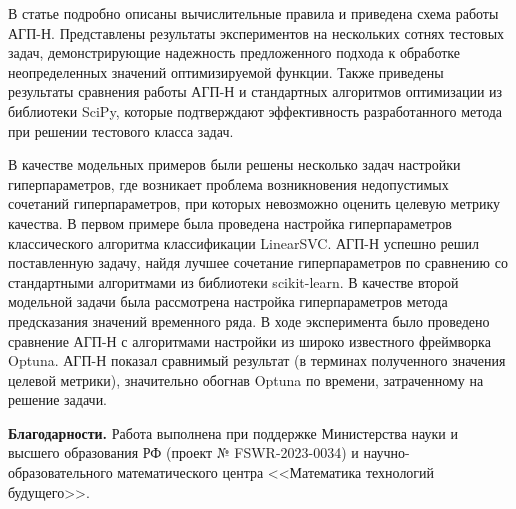 \documentclass[a4paper,12pt,russian]{article}
\begin{document}
В статье подробно описаны вычислительные правила и приведена схема работы АГП-Н. Представлены результаты экспериментов на нескольких сотнях тестовых задач, демонстрирующие надежность предложенного подхода к обработке неопределенных значений оптимизируемой функции. Также приведены результаты сравнения работы АГП-Н и стандартных алгоритмов оптимизации из библиотеки SciPy, которые подтверждают эффективность разработанного метода при решении тестового класса задач.

В качестве модельных примеров были решены несколько задач настройки гиперпараметров, где возникает проблема возникновения недопустимых сочетаний гиперпараметров, при которых невозможно оценить целевую метрику качества.
В первом примере была проведена настройка гиперпараметров классического алгоритма классификации LinearSVC. АГП-Н успешно решил поставленную задачу, найдя лучшее сочетание гиперпараметров по сравнению со стандартными алгоритмами из библиотеки scikit-learn.
В качестве второй модельной задачи была рассмотрена настройка гиперпараметров метода предсказания значений временного ряда. В ходе эксперимента было проведено сравнение АГП-Н с алгоритмами настройки из широко известного фреймворка Optuna. АГП-Н показал сравнимый результат (в терминах полученного значения целевой метрики), значительно обогнав Optuna по времени, затраченному на решение задачи.




\textbf{Благодарности.} Работа выполнена при поддержке Министерства науки и высшего образования РФ (проект № FSWR-2023-0034) и научно-образовательного математического центра <<Математика технологий будущего>>.
\end{document}
